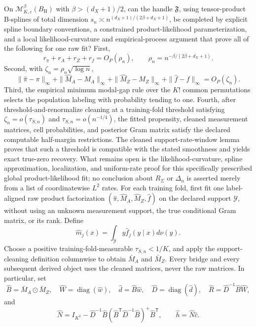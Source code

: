 On \(\mathcal M^{\beta}_{K,\varepsilon}(B_{\mathrm H})\) with \(\beta>(d_X+1)/2\), can the handle \(\mathfrak F\), using tensor-product B-splines of total dimension \(s_n\asymp n^{(d_X+1)/(2\beta+d_X+1)}\), be completed by explicit spline boundary conventions, a constrained product-likelihood parameterization, and a local likelihood-curvature and empirical-process argument that prove all of the following for one raw fit?  First,
\[
 r_\pi+r_A+r_Z+r_f=O_P(\rho_n),
 \qquad \rho_n=n^{-\beta/(2\beta+d_X+1)}.
\]
Second, with \(\zeta_n=\rho_n\sqrt{\log n}\),
\[
 \|\widehat\pi-\pi\|_\infty+
 \|\widehat M_A-M_A\|_\infty+
 \|\widehat M_Z-M_Z\|_\infty+
 \|\widehat f-f\|_\infty=O_P(\zeta_n).
\]
Third, the empirical minimum modal-gap rule over the \(K!\) common permutations selects the population labeling with probability tending to one.  Fourth, after threshold-and-renormalize cleaning at a training-fold threshold satisfying \(\zeta_n=o(\tau_{S,n})\) and \(\tau_{S,n}=o(n^{-1/4})\), the fitted propensity, cleaned measurement matrices, cell probabilities, and posterior Gram matrix satisfy the declared computable half-margin restrictions.  The cleaned support-rate-window lemma proves that such a threshold is compatible with the stated smoothness and yields exact true-zero recovery.  What remains open is the likelihood-curvature, spline approximation, localization, and uniform-rate proof for this specifically prescribed global product-likelihood fit; no conclusion about \(R_\Sigma\) or \(\Delta_n\) is asserted merely from a list of coordinatewise \(L^2\) rates.
For each training fold, first fit one label-aligned raw product factorization \((\widehat\pi,\widehat M_A,\widehat M_Z,\widehat f)\) on the declared support \(\mathcal Y\), without using an unknown measurement support, the true conditional Gram matrix, or its rank.  Define
\[
 \widehat m_j(x)=\int_{\mathcal Y}y\widehat f_j(y\mid x)d\nu(y).
\]
Choose a positive training-fold-measurable \(\tau_{S,n}<1/K\), and apply the support-cleaning definition columnwise to obtain \(\bar M_A\) and \(\bar M_Z\).  Every bridge and every subsequent derived object uses the cleaned matrices, never the raw matrices.  In particular, set
\[
 \widehat B=\bar M_A\odot\bar M_Z,
 \quad \widehat W=\operatorname{diag}(\widehat w),
 \quad \widehat d=\widehat B\widehat w,
 \quad \widehat D=\operatorname{diag}(\widehat d),
 \quad \widehat R=\widehat D^{-1}\widehat B\widehat W,
\]
and
\[
 \widehat N=I_{K^2}-\widehat D^{-1}\widehat B
 (\widehat B^{\mathsf T}\widehat D^{-1}\widehat B)^+
 \widehat B^{\mathsf T},
 \qquad \widehat h=\widehat N\widehat c.
\]
